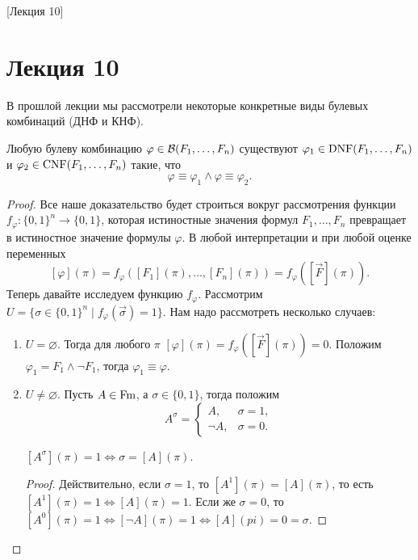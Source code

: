[Лекция 10]

\section{Лекция 10}

В прошлой лекции мы рассмотрели некоторые конкретные виды булевых комбинаций (ДНФ и КНФ).

\begin{theorem}
    Любую булеву комбинацию $\varphi \in \mathcal{B}(F_{1}, \ldots, F_{n})$ существуют $\varphi_{1} \in \operatorname{DNF}(F_{1}, \ldots, F_{n})$ и $\varphi_{2} \in \operatorname{CNF}(F_{1}, \ldots, F_{n})$ такие, что
    $$
        \varphi \equiv \varphi_{1} \land \varphi \equiv \varphi_{2}.
    $$
\end{theorem}

\begin{proof}
    Все наше доказательство будет строиться вокруг рассмотрения функции $f_{\varphi} \colon \{0, 1\}^{n} \to \{0, 1\}$, которая истиностные значения формул $F_{1}, \ldots, F_{n}$ превращает в истиностное значение формулы $\varphi$.
    В любой интерпретации и при любой оценке переменных
    $$
        [\varphi](\pi) = f_{\varphi}([F_{1}](\pi), \ldots, [F_{n}](\pi)) = f_{\varphi}([\vec{F}](\pi)).
    $$
    Теперь давайте исследуем функцию $f_{\varphi}$.
    Рассмотрим $U = \{\sigma \in \{0, 1\}^{n} \mid f_{\varphi}(\vec{\sigma}) = 1\}$.
    Нам надо рассмотреть несколько случаев:
    \begin{enumerate}
        \item $U = \varnothing$.
        Тогда для любого $\pi$ $[\varphi](\pi) = f_{\varphi}([\vec{F}](\pi)) = 0$.
        Положим $\varphi_{1} = F_{1} \land \neg F_{1}$, тогда $\varphi_{1} \equiv \varphi$.
        \item $U \neq \varnothing$.
        Пусть $A \in \mathrm{Fm}$, а $\sigma \in \{0, 1\}$, тогда положим
        $$
            A^{\sigma} = \begin{cases}
                A, & \sigma = 1, \\
                \neg A, & \sigma = 0.
            \end{cases}
        $$
        \begin{statement}
            $[A^{\sigma}](\pi) = 1 \iff \sigma = [A](\pi)$.
        \end{statement}
        \begin{proof}
            Действительно, если $\sigma = 1$, то $[A^{1}](\pi) = [A](\pi)$, то есть $[A^{1}](\pi) = 1 \iff [A](\pi) = 1$.
            Если же $\sigma = 0$, то $[A^{0}](\pi) = 1 \iff [\neg A](\pi) = 1 \iff [A](pi) = 0 = \sigma$.

\end{proof}
\end{enumerate}
\end{proof}

